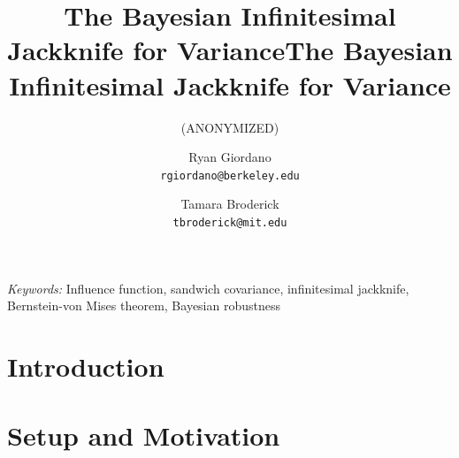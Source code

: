 \documentclass[12pt]{article} %
\def\spacingset#1{\renewcommand{\baselinestretch}%
    {#1}\small\normalsize} \spacingset{1.0}
\begin{document}
\title{The Bayesian Infinitesimal Jackknife for Variance}

 {
    \title{The Bayesian Infinitesimal Jackknife for Variance}
     { 
        \author{(ANONYMIZED)}
    } {
        \author{
            Ryan Giordano \\ \texttt{rgiordano@berkeley.edu}
            \and
            Tamara Broderick \\ \texttt{tbroderick@mit.edu}
            }        
    }
}



\maketitle

 {

    \begin{abstract}
    
    \end{abstract}        
    
    \noindent%
    {\it Keywords:}  Influence function, sandwich covariance,
        infinitesimal jackknife, Bernstein-von Mises theorem,
        Bayesian robustness
    \vfill    

    
    \newpage

    \spacingset{1.8} %
}


\section{Introduction}


\section{Setup and Motivation}


\end{document}
